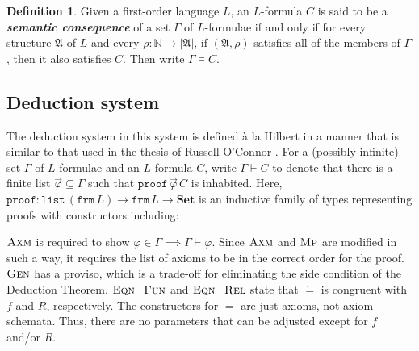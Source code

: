 \documentclass[twocolumn]{article}
\theoremstyle{definition}
\theoremstyle{definition}
\theoremstyle{definition}
\theoremstyle{definition}
\theoremstyle{definition}
\newtheorem{definition}[theorem]{Definition}
\theoremstyle{definition}
\theoremstyle{definition}
\newcommand{\inlinedef}[1]{\emph{\textbf{#1}}}
\newcommand{\IN}{\mathbb{N}}
\newcommand{\0}{\texttt{0}}
\newcommand{\1}{\texttt{1}}
\newcommand{\concat}{\ensuremath{+\!\!\!\!+\,}}
\newcommand{\FV}{\mathrm{FV}}
\newcommand{\proves}[2]{\mathtt{proof}\ #1\ #2 }
\newcommand{\listunit}[1]{[#1]}
\newcommand{\Leq}{\mathrel{\dot{=}}}
\newcommand{\Lto}{\mathrel{\dot{\to}}}
\newcommand{\Lall}[1]{\dot{\forall}#1\ }
\begin{document}
\begin{definition}
\label{d:model}
Given a first-order language $L$, an $L$-formula $C$ is said to be a \inlinedef{semantic consequence} of a set $\Gamma$ of $L$-formulae if and only if for every structure $\mathfrak{A}$ of $L$ and every $\rho : \IN \to | \mathfrak{A} |$, if $ (\mathfrak{A} , \rho ) $ satisfies all of the members of $\Gamma$, then it also satisfies $C$. Then write $\Gamma \vDash C$.
\end{definition}

\subsection{Deduction system}
\label{ss:Deduction-system}

The deduction system in this system is defined à la Hilbert in a manner that is similar to that used in the thesis of Russell O'Connor \cite{o2009incompleteness}.
For a (possibly infinite) set $\Gamma$ of $L$-formulae and an $L$-formula $C$, write $\Gamma \vdash C$ to denote that there is a finite list $\vec{\varphi} \subseteq \Gamma$ such that  $\mathtt{proof} \, \vec{\varphi} \, C$ is inhabited. Here, 
$\mathtt{proof} : \mathtt{list} \, ( \mathtt{frm} \, L ) \to \mathtt{frm} \, L \to \mathbf{Set}$ is an inductive family of types representing proofs with constructors including:

$\textsc{Axm}$ is required to show $\varphi \in \Gamma \implies \Gamma \vdash \varphi$. Since $\textsc{Axm}$ and $\textsc{Mp}$ are modified in such a way, it requires the list of axioms to be in the correct order for the proof.
$\textsc{Gen}$ has a proviso, which is a trade-off for eliminating the side condition of the Deduction Theorem.
$\textsc{Eqn\_Fun}$ and $\textsc{Eqn\_Rel}$ state that $\Leq$ is congruent with $f$ and $R$, respectively.
The constructors for $\Leq$ are just axioms, not axiom schemata. Thus, there are no parameters that can be adjusted except for $f$ and/or $R$.
\end{document}
